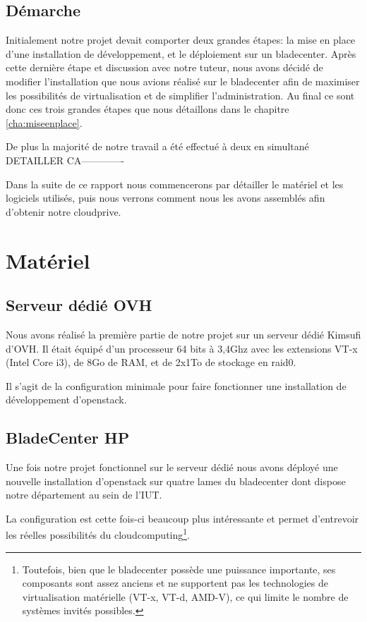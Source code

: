 \documentclass[a4paper,oneside]{report}
\begin{document}
\section{Démarche}
Initialement notre projet devait comporter deux grandes étapes: la mise en place d'une installation de développement, et le déploiement sur un \gls{bladecenter}. Après cette dernière étape et discussion avec notre tuteur, nous avons décidé de modifier l'installation que nous avions réalisé sur le \gls{bladecenter} afin de maximiser les possibilités de \gls{virtualisation} et de simplifier l'administration.\newline
Au final ce sont donc ces trois grandes étapes que nous détaillons dans le chapitre \ref{cha:miseenplace}.

De plus la majorité de notre travail a été effectué à deux en simultané DETAILLER CA-------------

Dans la suite de ce rapport nous commencerons par détailler le matériel et les logiciels utilisés, puis nous verrons comment nous les avons assemblés afin d'obtenir notre \gls{cloudprive}.


\chapter{Matériel}

\section{Serveur dédié OVH}
Nous avons réalisé la première partie de notre projet sur un serveur dédié Kimsufi d'OVH.
Il était équipé d'un processeur 64 bits à 3,4Ghz avec les extensions VT-x (Intel Core i3), de 8Go de RAM, et de 2x1To de stockage en \gls{raid0}.

Il s'agit de la configuration minimale pour faire fonctionner une installation de développement d'\gls{openstack}.

\section{BladeCenter HP}
Une fois notre projet fonctionnel sur le serveur dédié nous avons déployé une nouvelle installation d'\gls{openstack} sur quatre lames du \gls{bladecenter} dont dispose notre département au sein de l'IUT.

La configuration est cette fois-ci beaucoup plus intéressante et permet d'entrevoir les réelles possibilités du \gls{cloudcomputing}\footnote{Toutefois, bien que le \gls{bladecenter} possède une puissance importante, ses composants sont assez anciens et ne supportent pas les technologies de \gls{virtualisation} matérielle (VT-x, VT-d, AMD-V), ce qui limite le nombre de systèmes invités possibles.}.
\end{document}
